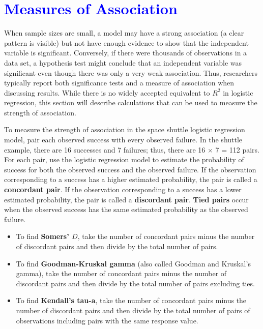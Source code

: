 \documentclass[
]{report}
\begin{document}
\hypertarget{section-69}{%
\section{\texorpdfstring{\textcolor{blue}{ Measures of Association}}{}}\label{section-69}}

When sample sizes are small, a model may have a strong association (a clear pattern is visible) but not have enough evidence to show that the independent variable is significant. Conversely, if there were thousands of observations in a data set, a hypothesis test might conclude that an independent variable was significant even though there was only a very weak association. Thus, researchers typically report both significance tests and a measure of association when discussing results. While there is no widely accepted equivalent to \(\scriptstyle R^2\) in logistic regression, this section will describe calculations that can be used to measure the strength of association.

To measure the strength of association in the space shuttle logistic regression model, pair each observed success with every observed failure. In the shuttle example, there are 16 successes and 7 failures; thus, there are 16 \(\times\) 7 = 112 pairs. For each pair, use the logistic regression model to estimate the probability of success for both the observed success and the observed failure. If the observation corresponding to a success has a higher estimated probability, the pair is called a \textbf{concordant pair}. If the observation corresponding to a success has a lower estimated probability, the pair is called a \textbf{discordant pair}. \textbf{Tied pairs} occur when the observed success has the same estimated probability as the observed failure.

\begin{itemize}
  \item To find \textbf{Somers’ $\scriptstyle D$}, take the number of concordant pairs minus the number of discordant pairs and then divide by the total number of pairs.
  \item To find \textbf{Goodman-Kruskal gamma} (also called Goodman and Kruskal’s gamma), take the number of concordant pairs minus the number of discordant pairs and then divide by the total number of pairs excluding ties.
  \item To find \textbf{Kendall’s tau-a}, take the number of concordant pairs minus the number of discordant pairs and then divide by the total number of pairs of observations including pairs with the same response value.
\end{itemize}
\end{document}
